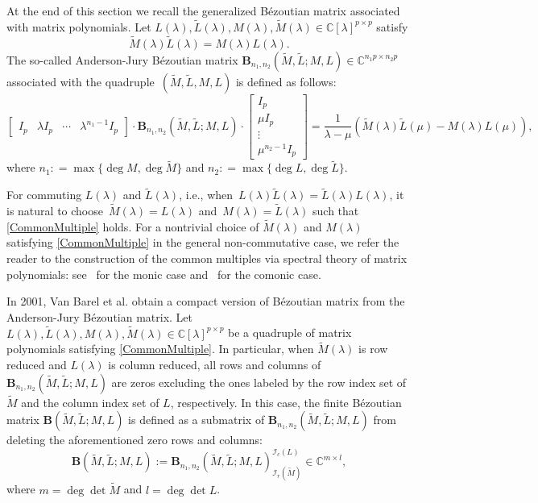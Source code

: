 \documentclass[12pt,reqno]{amsart}
\theoremstyle{plain}
\numberwithin{equation}{section}
\theoremstyle{remark}
\def\wtilde{\widetilde} \def\what{\widehat}
\newcommand{\coloneqq}{\mathrel{\mathop:}=}
\begin{document}
At the end of this section we recall the generalized B\'ezoutian matrix associated with matrix polynomials. 
Let $L(\lambda),\wtilde L(\lambda),M(\lambda), \wtilde M(\lambda)\in \mathbb C[\lambda]^{p\times p}$
satisfy
\begin{equation}\label{CommonMultiple}
    \wtilde M(\lambda)\wtilde L(\lambda)=M(\lambda)L(\lambda).
\end{equation}
The so-called  Anderson-Jury B\'ezoutian matrix ${\mathbf B}_{n_1,n_2}(\wtilde M,\wtilde L;M,L)\in \mathbb C^{n_1 p\times n_2 p}$
associated with the quadruple~$(\wtilde M,\wtilde L,M,L)$ is defined as follows:
\begin{equation*}   
\begin{bmatrix}I_p & \lambda I_p & \cdots & \lambda^{n_1-1}I_p \end{bmatrix}\cdot
    {\mathbf B}_{n_1,n_2}(\wtilde M,\wtilde L;M,L)\cdot
    \begin{bmatrix}I_p \\ \mu I_p \\ \vdots \\ \mu^{n_2-1}I_p \end{bmatrix}
    =\frac1{\lambda-\mu} \left(\wtilde M(\lambda)\wtilde L(\mu)-M(\lambda)L(\mu)\right), %
\end{equation*}
where $n_1\coloneqq\max\{\deg M, \deg \wtilde M\}$ and
$n_2\coloneqq\max\{\deg L, \deg \wtilde L\}$. 

For commuting $L(\lambda)$ and $\wtilde L(\lambda)$, i.e., when~$L(\lambda)\wtilde L(\lambda)=\wtilde L(\lambda)L(\lambda)$, it is natural to choose~$\wtilde M(\lambda)=L(\lambda)$ and~$M(\lambda)=\wtilde L(\lambda)$ such that \eqref{CommonMultiple} holds. For a nontrivial
choice of $\wtilde M(\lambda)$ and $M(\lambda)$ satisfying \eqref{CommonMultiple} in the general non-commutative case, we refer the reader to the
construction of the common multiples via spectral theory of matrix polynomials:
see~\cite[Theorem 9.11]{GLRMP} for the monic case and~\cite[Theorem 2.2]{GKLR} for the comonic
case.

In 2001, Van Barel et al. \cite{BPV} obtain a compact version of B\'ezoutian matrix from the Anderson-Jury B\'ezoutian matrix.
Let $L(\lambda),\wtilde L(\lambda),M(\lambda), \wtilde M(\lambda)\in \mathbb C[\lambda]^{p\times p}$ be a quadruple of matrix polynomials 
satisfying \eqref{CommonMultiple}.
In particular, when $\wtilde M(\lambda)$ is row reduced and $L(\lambda)$ is column reduced, all rows and columns of
${\mathbf B}_{n_1,n_2}(\wtilde M,\wtilde L;M,L)$ are zeros excluding the ones   labeled by the row index set of $\wtilde M$ and the column index set of $L$, respectively. In this case, 
the finite B\'ezoutian matrix ${\mathbf B}(\wtilde M,\wtilde L;M, L)$ is defined as a submatrix of ${\mathbf B}_{n_1,n_2}(\wtilde M,\wtilde L;M,L)$ from deleting the aforementioned zero rows  and columns:
$$
{\mathbf B}(\wtilde M,\wtilde L;M, L):={\mathbf B}_{n_1,n_2}(\wtilde M,\wtilde L;M, L)_{\mathcal I_r({\wtilde M})}^{\mathcal I_c({L})}\in \mathbb C^{m\times l},
$$
where $m=\deg \det \wtilde M$ and $l=\deg \det L$.
\end{document}
